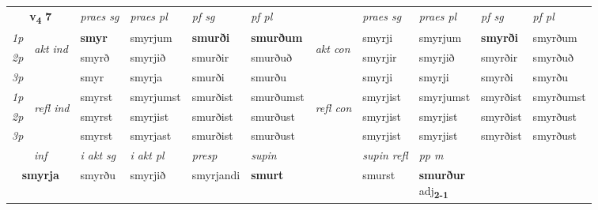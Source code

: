 \noindent
\begin{tabular}{lllllllllll} \toprule
\multicolumn{2}{c}{\textbf{v{\textsubscript{4}}} \Large{\textbf{7}}}  &  \textit{praes sg}  & \textit{praes pl}  &\textit{ pf sg} & \textit{pf pl} &  &  \textit{praes sg}  & \textit{praes pl}  & \textit{pf sg} & \textit{pf pl } \\*
	\cmidrule{3-6} \cmidrule{8-11}
 {\textit{1p}} & \multirow{3}{*}{\begin{turn}{90}\textit{akt ind}\end{turn}} & \textbf{smyr} & smyrjum & \textbf{smurði} & \textbf{smurðum} & \multirow{3}{*}{\begin{turn}{90}\textit{akt con}\end{turn}} &smyrji & smyrjum & \textbf{smyrði} & smyrðum\\*
 {\textit{2p}} &  &  smyrð  & smyrjið & smurðir & smurðuð & & smyrjir & smyrjið & smyrðir & smyrðuð \\*
{\textit{3p}} &  & smyr & smyrja & smurði & smurðu & & smyrji & smyrji& smyrði & smyrðu \\*
\cmidrule{3-6} \cmidrule{8-11}
 {\textit{1p}} & \multirow{3}{*}{\begin{turn}{90}\textit{refl ind}\end{turn}}  & smyrst & smyrjumst & smurðist & smurðumst & \multirow{3}{*}{\begin{turn}{90}\textit{refl con}\end{turn}}  &smyrjist & smyrjumst & smyrðist & smyrðumst \\*
 {\textit{2p}} &  & smyrst & smyrjist & smurðist & smurðust & &smyrjist & smyrjist & smyrðist & smyrðust \\*
 {\textit{3p}}  & & smyrst & smyrjast & smurðist & smurðust & & smyrjist & smyrjist& smyrðist & smyrðust \\*
\cmidrule{3-6} \cmidrule{8-11}

   \multicolumn{2}{c}{\textit{inf}}  & \textit{i akt sg} & \textit{i akt pl}   & \textit{presp} & \textit{supin} && \textit{supin refl} & \textit{pp m} \\*
  \multicolumn{2}{c}{\textbf{smyrja}} & smyrðu  & smyrjið   & smyrjandi &  \textbf{smurt} && smurst & \specialcell{\textbf{smurður} \\ adj\textbf{\textsubscript{2-1}}} \\*
\end{tabular}

